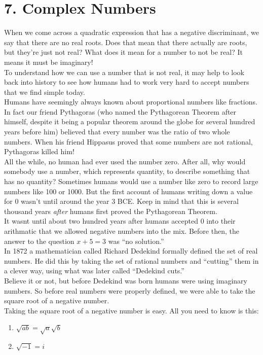 \documentclass[12pt,fleqn]{book}
\begin{document}
\chapter{7. Complex Numbers}
When we come across a quadratic expression that has a negative discriminant, we say that there are no real roots.  Does that mean that there actually are roots, but they're just not real?  What does it mean for a number to not be real?  It means it must be imaginary!
\\[1em]
To understand how we can use a number that is not real, it may help to look back into history to see how humans had to work very hard to accept numbers that we find simple today.
\\[1em]
Humans have seemingly always known about proportional numbers like fractions.  In fact our friend Pythagoras (who named the Pythagorean Theorem after himself, despite it being a popular theorem around the globe for several hundred years before him) believed that every number was the ratio of two whole numbers.  When his friend Hippasus proved that some numbers are not rational, Pythagoras killed him!
\\[1em]
All the while, no human had ever used the number zero.  After all, why would somebody use a number, which represents quantity, to describe something that has no quantity?  Sometimes humans would use a number like zero to record large numbers like 100 or 1000.  But the first account of humans writing down a value for 0 wasn't until around the year 3 BCE.  Keep in mind that this is several thousand years \emph{after} humans first proved the Pythagorean Theorem.
\\[1em]
It wasnt until about two hundred years after humans accepted 0 into their arithmatic that we allowed negative numbers into the mix.  Before then, the answer to the question $x+5=3$ was ``no solution.''
\\[1em]
In 1872 a mathematician called Richard Dedekind formally defined the set of real numbers.  He did this by taking the set of rational numbers and ``cutting'' them in a clever way, using what was later called ``Dedekind cuts.''
\\[1em]
Believe it or not, but before Dedekind was born humans were using imaginary numbers.  So before real numbers were properly defined, we were able to take the square root of a negative number.
\\[3em]
Taking the square root of a negative number is easy.  All you need to know is this:
\begin{enumerate}
	\item $\sqrt{ab}=\sqrt a \sqrt b$
	\item $\sqrt{-1}=i$
\end{enumerate}
\end{document}
